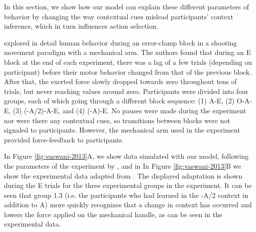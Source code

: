 \documentclass[a4paper,doc,floatsintext,natbib]{apa6}
\def \fref #1{Figure \ref{#1}}     %
\begin{document}
In this section, we show how our model can explain these different parameters of behavior by changing the way contextual cues mislead participants' context inference, which in turn influences action selection.

\cite{Vaswani_Decay_2013} explored in detail human behavior during an error-clamp block in a shooting movement paradigm with a mechanical arm. The authors found that during an E block at the end of each experiment, there was a lag of a few trials (depending on participant) before their motor behavior changed from that of the previous block. After that, the exerted force slowly dropped towards zero throughout tens of trials, but never reaching values around zero. Participants were divided into four groups, each of which going through a different block sequence: (1) A-E, (2) O-A-E, (3) (-A/2)-A-E, and (4) (-A)-E. No pauses were made during the experiment nor were there any contextual cues, so transitions between blocks were not signaled to participants. However, the mechanical arm used in the experiment provided force-feedback to participants.

In \fref{fig:vaswani-2013}A, we show data simulated with our model, following the parameters of the experiment by \cite{Vaswani_Decay_2013}, and in In \fref{fig:vaswani-2013}B we show the experimental data adapted from \cite{Vaswani_Decay_2013}. The displayed adaptation is shown during the E trials for the three experimental groups in the experiment. It can be seen that group 1.3 (i.e. the participants who had learned in the -A/2 context in addition to A) more quickly recognizes that a change in context has occurred and lowers the force applied on the mechanical handle, as can be seen in the experimental data.
\end{document}
